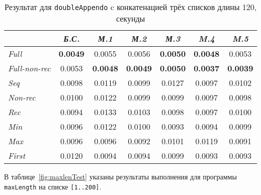 \begin{table}[h!]
\center
\begin{tabular}{|l|c|c|c|c|c|c|}
\hline
                   &{\it Б.С.}&{\it М.1}&{\it М.2}&{\it М.3}&{\it M.4} & {\it M.5} \\ \hline
{\it Full        }& {\bf 0.0049}  & 0.0055       & 0.0056       & {\bf 0.0050} & {\bf 0.0048} & 0.0053\\ \hline
{\it Full-non-rec}& 0.0053        & {\bf 0.0048} & {\bf 0.0049} & {\bf 0.0050} & {\bf 0.0037} & {\bf 0.0039} \\ \hline
{\it Seq         }& 0.0098        & 0.0119       & 0.0099       & 0.0127       & 0.0097       & 0.0102 \\ \hline
{\it Non-rec     }& 0.0100        & 0.0122       & 0.0099       & 0.0099       & 0.0097       & 0.0098 \\ \hline
{\it Rec         }& 0.0094        & 0.0133       & 0.0103       & 0.0098       & 0.0097       & 0.0100 \\ \hline
{\it Min         }& 0.0096        & 0.0122       & 0.0100       & 0.0093       & 0.0094       & 0.0099 \\ \hline
{\it Max         }& 0.0096        & 0.0096       & 0.0092       & 0.0101       & 0.0119       & 0.0091 \\ \hline
{\it First       }& 0.0120        & 0.0094       & 0.0094       & 0.0099       & 0.0093       & 0.0093 \\ \hline

\end{tabular}
\caption{Результат для \lstinline{doubleAppendo} c конкатенацией трёх списков длины 120, секунды}
\label{fig:dappTest}
\end{table}

В таблице~\ref{fig:maxlenTest} указаны результаты выполнения для
программы \lstinline{maxLength} на списке \lstinline{[1..200]}.

